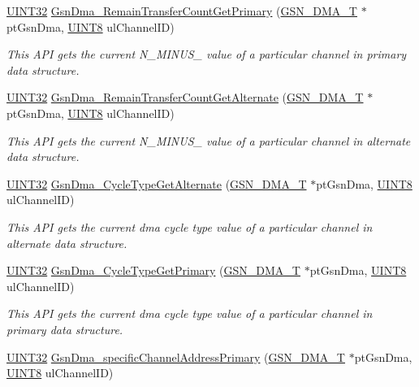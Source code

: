 \begin{DoxyCompactItemize}
\hyperlink{a00660_gae1e6edbbc26d6fbc71a90190d0266018}{UINT32} \hyperlink{a00645_ga41c22392f7c2bcb6371732f7b4262458}{GsnDma\_\-RemainTransferCountGetPrimary} (\hyperlink{a00049}{GSN\_\-DMA\_\-T} $\ast$ptGsnDma, \hyperlink{a00660_gab27e9918b538ce9d8ca692479b375b6a}{UINT8} ulChannelID)
\begin{DoxyCompactList}\small\item\em This API gets the current N\_\-MINUS\_ value of a particular channel in primary data structure. \end{DoxyCompactList}\item 
\hyperlink{a00660_gae1e6edbbc26d6fbc71a90190d0266018}{UINT32} \hyperlink{a00645_ga77f7365ca642ec971dd49bae1d30b204}{GsnDma\_\-RemainTransferCountGetAlternate} (\hyperlink{a00049}{GSN\_\-DMA\_\-T} $\ast$ptGsnDma, \hyperlink{a00660_gab27e9918b538ce9d8ca692479b375b6a}{UINT8} ulChannelID)
\begin{DoxyCompactList}\small\item\em This API gets the current N\_\-MINUS\_ value of a particular channel in alternate data structure. \end{DoxyCompactList}\item 
\hyperlink{a00660_gae1e6edbbc26d6fbc71a90190d0266018}{UINT32} \hyperlink{a00645_gad08a96af8d3b08b5353491f376838f04}{GsnDma\_\-CycleTypeGetAlternate} (\hyperlink{a00049}{GSN\_\-DMA\_\-T} $\ast$ptGsnDma, \hyperlink{a00660_gab27e9918b538ce9d8ca692479b375b6a}{UINT8} ulChannelID)
\begin{DoxyCompactList}\small\item\em This API gets the current dma cycle type value of a particular channel in alternate data structure. \end{DoxyCompactList}\item 
\hyperlink{a00660_gae1e6edbbc26d6fbc71a90190d0266018}{UINT32} \hyperlink{a00645_gaeec67a57b069b989d58c6ee008406dc2}{GsnDma\_\-CycleTypeGetPrimary} (\hyperlink{a00049}{GSN\_\-DMA\_\-T} $\ast$ptGsnDma, \hyperlink{a00660_gab27e9918b538ce9d8ca692479b375b6a}{UINT8} ulChannelID)
\begin{DoxyCompactList}\small\item\em This API gets the current dma cycle type value of a particular channel in primary data structure. \end{DoxyCompactList}\item 
\hyperlink{a00660_gae1e6edbbc26d6fbc71a90190d0266018}{UINT32} \hyperlink{a00645_gaa773c3c1a9478d26317cc2f8f6221be4}{GsnDma\_\-specificChannelAddressPrimary} (\hyperlink{a00049}{GSN\_\-DMA\_\-T} $\ast$ptGsnDma, \hyperlink{a00660_gab27e9918b538ce9d8ca692479b375b6a}{UINT8} ulChannelID)

\end{DoxyCompactItemize}
